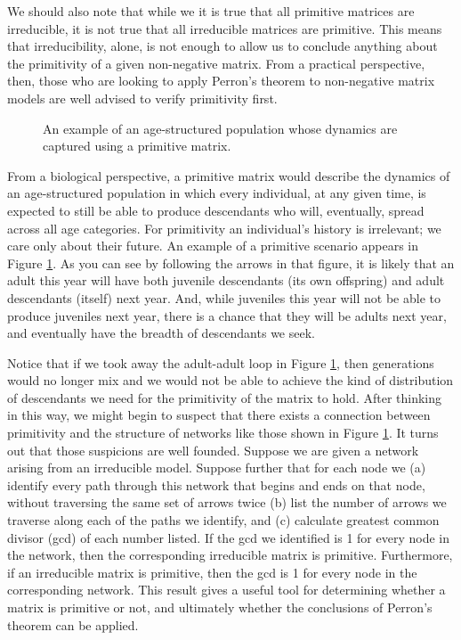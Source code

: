\documentclass[../book.tex]{subfiles}
\begin{document}
We should also note that while we it is true that all primitive matrices are irreducible, it is not true that all irreducible matrices are primitive. This means that irreducibility, alone, is not enough to allow us to conclude anything about the primitivity of a given non-negative matrix. From a practical perspective, then, those who are looking to apply Perron's theorem to non-negative matrix models are well advised to verify primitivity first.

\begin{figure}[htbp]
  \centering
  \caption{An example of an age-structured population whose dynamics are captured using a primitive matrix.}
  \label{fig:net}
\end{figure}

From a biological perspective, a primitive matrix would describe the dynamics of an age-structured population in which every individual, at any given time, is expected to still be able to produce descendants who will, eventually, spread across all age categories. For primitivity an individual's history is irrelevant; we care only about their future. An example of a primitive scenario appears in Figure \ref{fig:net}. As you can see by following the arrows in that figure, it is likely that an adult this year will have both juvenile descendants (its own offspring) and adult descendants (itself) next year. And, while juveniles this year will not be able to produce juveniles next year, there is a chance that they will be adults next year, and eventually have the breadth of descendants we seek.

Notice that if we took away the adult-adult loop in Figure \ref{fig:net}, then generations would no longer mix and we would not be able to achieve the kind of distribution of descendants we need for the primitivity of the matrix to hold. After thinking in this way, we might begin to suspect that there exists a connection between primitivity and the structure of networks like those shown in Figure \ref{fig:net}. It turns out that those suspicions are well founded. Suppose we are given a network arising from an irreducible model. Suppose further that for each node we (a) identify every path through this network that begins and ends on that node, without traversing the same set of arrows twice (b) list the number of arrows we traverse along each of the paths we identify, and (c) calculate greatest common divisor (gcd) of each number listed. If the gcd we identified is 1 for every node in the network, then the corresponding irreducible matrix is primitive. Furthermore, if an irreducible matrix is primitive, then the gcd is 1 for every node in the corresponding network. This result gives a useful tool for determining whether a matrix is primitive or not, and ultimately whether the conclusions of Perron's theorem can be applied.
\end{document}
